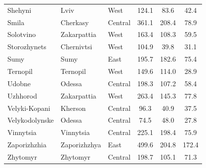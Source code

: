\documentclass[sn-basic]{sn-jnl}%
\begin{document}
{\begin{appendices}
\begin{longtable}{lllccc}
Shehyni             & Lviv            & West    & 124.1                                & 83.6  & 42.4      \\
Smila               & Cherkasy        & Central & 361.1                                & 208.4 & 78.9      \\
Solotvino           & Zakarpattia     & West    & 163.4                                & 108.3 & 59.5      \\
Storozhynets        & Chernivtsi      & West    & 104.9                                & 39.8  & 31.1      \\
Sumy                & Sumy            & East    & 195.7                                & 182.6 & 75.4      \\
Ternopil            & Ternopil        & West    & 149.6                                & 114.0 & 28.9      \\
Udobne              & Odessa          & Central & 198.3                                & 107.2 & 58.4      \\
Uzhhorod            & Zakarpattia     & West    & 263.4                                & 145.3 & 77.8      \\
Velyki-Kopani       & Kherson         & Central & 96.3                                 & 40.9  & 37.5      \\
Velykodolynske      & Odessa          & Central & 74.5                                 & 48.0  & 27.8      \\
Vinnytsia           & Vinnytsia       & Central & 225.1                                & 198.4 & 75.9      \\
Zaporizhzhia        & Zaporizhzhya    & East    & 499.6                                & 204.8 & 172.4     \\
Zhytomyr            & Zhytomyr        & Central & 198.7                                & 105.1 & 71.3     \\ 
\bottomrule
\end{longtable}




\end{appendices}}
\end{document}
